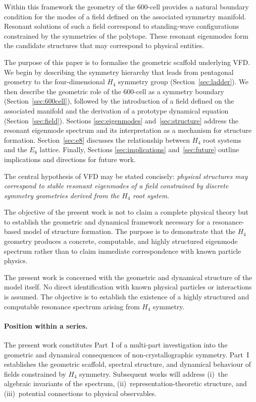 \documentclass[12pt,a4paper]{article}
\newcommand{\Hfour}{H_4}
\newcommand{\Eeight}{E_8}
\begin{document}
Within this framework the geometry of the 600-cell provides a natural boundary
condition for the modes of a field defined on the associated symmetry
manifold.  Resonant solutions of such a field correspond to standing-wave
configurations constrained by the symmetries of the polytope.  These resonant
eigenmodes form the candidate structures that may correspond to physical
entities.

The purpose of this paper is to formalise the geometric scaffold underlying
VFD\@.  We begin by describing the symmetry hierarchy that leads from
pentagonal geometry to the four-dimensional $\Hfour$ symmetry group
(Section~\ref{sec:ladder}).  We then describe the geometric role of the
600-cell as a symmetry boundary (Section~\ref{sec:600cell}), followed by the
introduction of a field defined on the associated manifold and the derivation
of a prototype dynamical equation (Section~\ref{sec:field}).  Sections
\ref{sec:eigenmodes} and~\ref{sec:structure} address the resonant eigenmode
spectrum and its interpretation as a mechanism for structure formation.
Section~\ref{sec:e8} discusses the relationship between $\Hfour$ root systems
and the $\Eeight$ lattice.  Finally, Sections \ref{sec:implications}
and~\ref{sec:future} outline implications and directions for future work.

The central hypothesis of VFD may be stated concisely: \emph{physical
structures may correspond to stable resonant eigenmodes of a field constrained
by discrete symmetry geometries derived from the $\Hfour$ root system.}

The objective of the present work is not to claim a complete physical theory
but to establish the geometric and dynamical framework necessary for a
resonance-based model of structure formation.  The purpose is to demonstrate
that the $\Hfour$ geometry produces a concrete, computable, and highly
structured eigenmode spectrum rather than to claim immediate correspondence
with known particle physics.

The present work is concerned with the geometric and dynamical structure
of the model itself.  No direct identification with known physical particles
or interactions is assumed.  The objective is to establish the existence of a
highly structured and computable resonance spectrum arising from $\Hfour$
symmetry.

\paragraph{Position within a series.}
The present work constitutes Part~I of a multi-part investigation into the
geometric and dynamical consequences of non-crystallographic symmetry.
Part~I establishes the geometric scaffold, spectral structure, and
dynamical behaviour of fields constrained by $\Hfour$ symmetry.
Subsequent works will address (i)~the algebraic invariants of the spectrum,
(ii)~representation-theoretic structure, and (iii)~potential connections
to physical observables.
\end{document}
